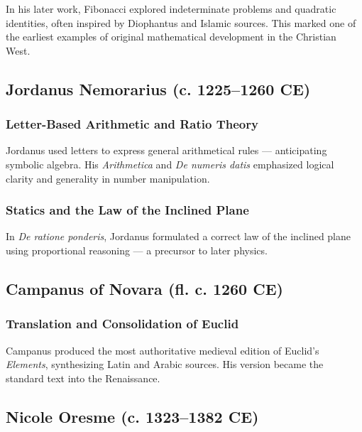\documentclass[9pt]{article}
\begin{document}
In his later work, Fibonacci explored indeterminate problems and quadratic identities, often inspired by Diophantus and Islamic sources.  
This marked one of the earliest examples of original mathematical development in the Christian West.

\vspace{0.5em}

\subsection*{Jordanus Nemorarius (c. 1225–1260 CE)}

\subsubsection*{Letter-Based Arithmetic and Ratio Theory}

Jordanus used letters to express general arithmetical rules — anticipating symbolic algebra.  
His \textit{Arithmetica} and \textit{De numeris datis} emphasized logical clarity and generality in number manipulation.

\subsubsection*{Statics and the Law of the Inclined Plane}

In \textit{De ratione ponderis}, Jordanus formulated a correct law of the inclined plane using proportional reasoning — a precursor to later physics.

\vspace{0.5em}

\subsection*{Campanus of Novara (fl. c. 1260 CE)}

\subsubsection*{Translation and Consolidation of Euclid}

Campanus produced the most authoritative medieval edition of Euclid’s \textit{Elements}, synthesizing Latin and Arabic sources.  
His version became the standard text into the Renaissance.

\vspace{0.5em}

\subsection*{Nicole Oresme (c. 1323–1382 CE)}
\end{document}
